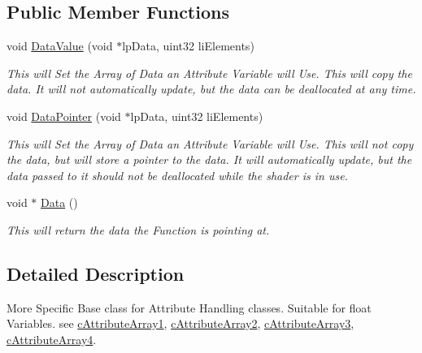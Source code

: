 \subsection*{Public Member Functions}
\begin{DoxyCompactItemize}
\item 
\hypertarget{classc_float_attribute_store_af9721a74ced818c5ae1aee3043b9a6bb}{
void \hyperlink{classc_float_attribute_store_af9721a74ced818c5ae1aee3043b9a6bb}{DataValue} (void $\ast$lpData, uint32 liElements)}
\label{classc_float_attribute_store_af9721a74ced818c5ae1aee3043b9a6bb}

\begin{DoxyCompactList}\small\item\em This will Set the Array of Data an Attribute Variable will Use. This will copy the data. It will not automatically update, but the data can be deallocated at any time. \end{DoxyCompactList}\item 
\hypertarget{classc_float_attribute_store_a930627974932e8bca72f6c4dd70c68a8}{
void \hyperlink{classc_float_attribute_store_a930627974932e8bca72f6c4dd70c68a8}{DataPointer} (void $\ast$lpData, uint32 liElements)}
\label{classc_float_attribute_store_a930627974932e8bca72f6c4dd70c68a8}

\begin{DoxyCompactList}\small\item\em This will Set the Array of Data an Attribute Variable will Use. This will not copy the data, but will store a pointer to the data. It will automatically update, but the data passed to it should not be deallocated while the shader is in use. \end{DoxyCompactList}\item 
\hypertarget{classc_float_attribute_store_acf7c84372c2259cd6921013083730e4b}{
void $\ast$ \hyperlink{classc_float_attribute_store_acf7c84372c2259cd6921013083730e4b}{Data} ()}
\label{classc_float_attribute_store_acf7c84372c2259cd6921013083730e4b}

\begin{DoxyCompactList}\small\item\em This will return the data the Function is pointing at. \end{DoxyCompactList}\end{DoxyCompactItemize}


\subsection{Detailed Description}
More Specific Base class for Attribute Handling classes. Suitable for float Variables. see \hyperlink{classc_attribute_array1}{cAttributeArray1}, \hyperlink{classc_attribute_array2}{cAttributeArray2}, \hyperlink{classc_attribute_array3}{cAttributeArray3}, \hyperlink{classc_attribute_array4}{cAttributeArray4}. 